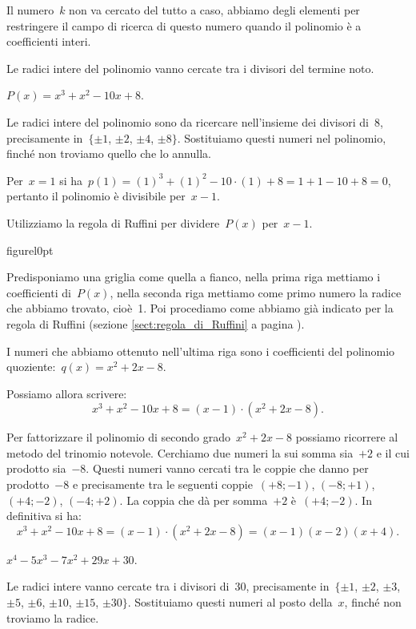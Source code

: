 Il numero~$k$ non va cercato del tutto a caso, abbiamo degli elementi per
restringere il campo di ricerca di questo numero quando il polinomio
è a coefficienti interi.

\osservazione Le radici intere del polinomio vanno cercate tra i divisori del termine
noto.

\begin{exrig}
 \begin{esempio}
 $P(x)=x^{3}+x^{2}-10x+8$.
 \end{esempio}
Le radici intere del polinomio sono da ricercare
nell'insieme dei divisori di~8, precisamente in~$\{\pm 1$, $\pm 2$, $\pm 4$, $\pm 8\}$.
Sostituiamo questi numeri nel polinomio,
finché non troviamo quello che lo annulla.

Per~$x=1$ si ha~$p(1)=(1)^{3}+(1)^{2}-10\cdot (1)+8=1+1-10+8=0$,
pertanto il polinomio è divisibile per~$x-1$.

Utilizziamo la regola di Ruffini per dividere~$P(x)$ per~$x-1$.

\begin{wrapfloat}{figure}{l}{0pt}
 
\end{wrapfloat}

Predisponiamo una griglia come quella a fianco, nella prima riga mettiamo i
coefficienti di~$P(x)$, nella seconda riga mettiamo come primo numero la
radice che abbiamo trovato, cioè~1. Poi procediamo come abbiamo già
indicato per la regola di Ruffini (sezione \ref{sect:regola_di_Ruffini} a pagina \pageref{sect:regola_di_Ruffini}).

I numeri che abbiamo ottenuto nell'ultima riga sono i
coefficienti del polinomio quoziente:~$q(x)=x^{2}+2x-8$.

Possiamo allora scrivere:
\[x^{3}+x^{2}-10x+8=(x-1)\cdot (x^{2}+2x-8).\]

Per fattorizzare il polinomio di secondo grado~$x^{2}+2x-8$ possiamo
ricorrere al metodo del trinomio notevole. Cerchiamo due numeri la sui
somma sia~$+2$ e il cui prodotto sia~$-8$. Questi numeri vanno cercati tra
le coppie che danno per prodotto~$-8$ e precisamente tra le seguenti
coppie~$(+8;-1)$, $(-8;+1)$, $(+4;-2)$, $(-4;+2)$. La coppia che dà per
somma~$+2$ è~$(+4;-2)$. In definitiva si ha:
\[x^{3}+x^{2}-10x+8=(x-1)\cdot (x^{2}+2x-8)=(x-1)(x-2)(x+4).\]


 \begin{esempio}
$x^{4}-5x^{3}-7x^{2}+29x+30$.
\end{esempio}

Le radici intere vanno cercate tra i divisori di~30, precisamente in~$\{\pm 1$, $\pm 2$, $\pm 3$, $\pm 5$, $\pm 6$, $\pm 10$, $\pm 15$, $\pm 30\}$.
Sostituiamo questi numeri al posto della~$x$, finché non troviamo la
radice.


\end{exrig}
